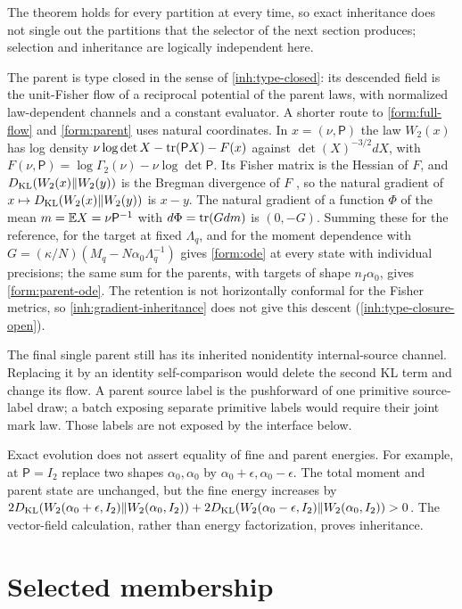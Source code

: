 The theorem holds for every partition at every time, so exact inheritance does not single out the partitions that the selector of the next section produces; selection and inheritance are logically independent here.

The parent is type closed in the sense of \cref{inh:type-closed}: its descended field is the unit-Fisher flow of a reciprocal potential of the parent laws, with normalized law-dependent channels and a constant evaluator. A shorter route to \cref{form:full-flow} and \cref{form:parent} uses natural coordinates. In $x=(\nu,\mathsf P)$ the law $W_2(x)$ has log density $\nu\log\det X-\operatorname{tr}(\mathsf PX)-F(x)$ against $\det(X)^{-3/2}dX$, with $F(\nu,\mathsf P)=\log\Gamma_2(\nu)-\nu\log\det\mathsf P$. Its Fisher matrix is the Hessian of $F$, and $D_{\mathrm{KL}}(W_2(x)\Vert W_2(y))$ is the Bregman divergence of $F$ \citep{AmariNagaoka2000}, so the natural gradient of $x\mapsto D_{\mathrm{KL}}(W_2(x)\Vert W_2(y))$ is $x-y$. The natural gradient of a function $\Phi$ of the mean $m=\mathbb E X=\nu\mathsf P^{-1}$ with $d\Phi=\operatorname{tr}(G dm)$ is $(0,-G)$. Summing these for the reference, for the target at fixed $\Lambda_q$, and for the moment dependence with $G=(\kappa/N)(M_q-N\alpha_0\Lambda_q^{-1})$ gives \cref{form:ode} at every state with individual precisions; the same sum for the parents, with targets of shape $n_I\alpha_0$, gives \cref{form:parent-ode}. The retention is not horizontally conformal for the Fisher metrics, so \cref{inh:gradient-inheritance} does not give this descent (\cref{inh:type-closure-open}).

The final single parent still has its inherited nonidentity internal-source
channel. Replacing it by an identity self-comparison would delete the second
KL term and change its flow. A parent source label is the pushforward of one
primitive source-label draw; a batch exposing separate primitive labels would
require their joint mark law. Those labels are not exposed by the interface
below.

Exact evolution does not assert equality of fine and parent energies.
For example, at $\mathsf P=I_2$ replace two shapes $\alpha_0,\alpha_0$ by
$\alpha_0+\epsilon,\alpha_0-\epsilon$. The total moment and parent state are
unchanged, but the fine energy increases by
$2D_{\mathrm{KL}}(W_2(\alpha_0+\epsilon,I_2)\Vert W_2(\alpha_0,I_2))+
2D_{\mathrm{KL}}(W_2(\alpha_0-\epsilon,I_2)\Vert W_2(\alpha_0,I_2))>0$.
The vector-field calculation, rather than energy factorization, proves
inheritance.

\section{Selected membership}

